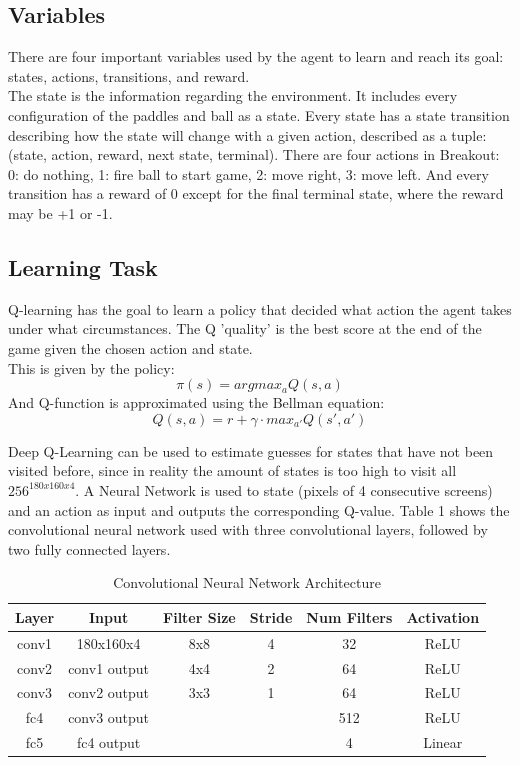 \documentclass{article}
\begin{document}
\subsection{Variables}
There are four important variables used by the agent to learn and reach its goal: states, actions, transitions, and reward. \\

The state is the information regarding the environment. It includes every configuration of the paddles and ball as a state. Every state has a state transition describing how the state will change with a given action, described as a tuple: (state, action, reward, next state, terminal). There are four actions in Breakout: 0: do nothing, 1: fire ball to start game, 2: move right, 3: move left. And every transition has a reward of 0 except for the final terminal state, where the reward may be +1 or -1. 


\subsection{Learning Task}
Q-learning has the goal to learn a policy that decided what action the agent takes under what circumstances. The Q 'quality' is the best score at the end of the game given the chosen action and state. \\
This is given by the policy: \\
\begin{equation}
\pi (s) = argmax_a Q(s,a)
\end{equation}
And Q-function is approximated using the Bellman equation: \\
\begin{equation}
Q(s,a) = r + \gamma \cdot max_{a'} Q(s',a')
\end{equation}

Deep Q-Learning can be used to estimate guesses for states that have not been visited before, since in reality the amount of states is too high to visit all $256^{180 x 160 x4}$. A Neural Network is used to state (pixels of 4 consecutive screens) and an action as input and outputs the corresponding Q-value. Table 1 shows the convolutional neural network used with three convolutional layers, followed by two fully connected layers.

\begin{table}[ht]
    \centering
    \begin{tabular}{||c c c c c c||} 
     \hline
     Layer & Input & Filter Size & Stride & Num Filters & Activation \\ [0.5ex] 
     \hline\hline
     conv1 & 180x160x4 & 8x8 & 4 & 32 & ReLU \\ 
     \hline
     conv2 & conv1 output & 4x4 & 2 & 64 & ReLU \\
     \hline
     conv3 & conv2 output & 3x3 & 1 & 64 & ReLU \\
     \hline
     fc4 & conv3 output & & & 512 & ReLU \\
     \hline
     fc5 & fc4 output & & & 4 & Linear \\ [1ex] 
     \hline
    \end{tabular}
    \caption{Convolutional Neural Network Architecture}
    \label{tab:my_label}
\end{table}
\end{document}
